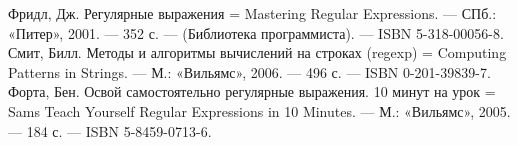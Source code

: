 \documentclass[12pt]{report}
\begin{document}
\begin{thebibliography}{3}
	Фридл, Дж. Регулярные выражения = Mastering Regular Expressions. — СПб.: «Питер», 2001. — 352 с. — (Библиотека программиста). — ISBN 5-318-00056-8.
	Смит, Билл. Методы и алгоритмы вычислений на строках (regexp) = Computing Patterns in Strings. — М.: «Вильямс», 2006. — 496 с. — ISBN 0-201-39839-7.
	Форта, Бен. Освой самостоятельно регулярные выражения. 10 минут на урок = Sams Teach Yourself Regular Expressions in 10 Minutes. — М.: «Вильямс», 2005. — 184 с. — ISBN 5-8459-0713-6.
\end{thebibliography}
\end{document}
